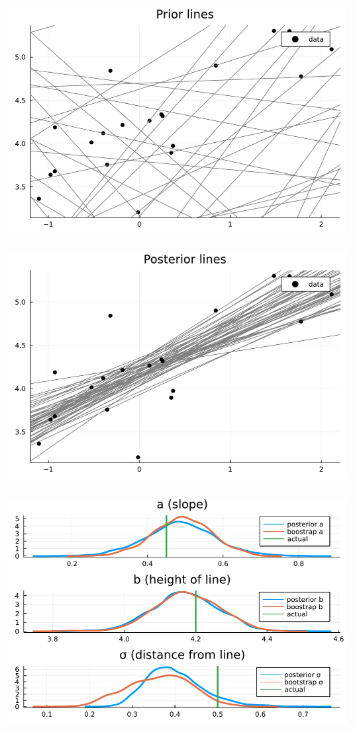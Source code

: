 \documentclass[aspectratio=169,xcolor=svgnames]{beamer}
\begin{document}
\begin{frame}
  \begin{figure}[ht]
    \centering
    \includegraphics[width=0.8\textwidth]{figures/linear_prior_lines.pdf}
  \end{figure}
\end{frame}

\begin{frame}
  \begin{figure}[ht]
    \centering
    \includegraphics[width=0.8\textwidth]{figures/posterior_lines.pdf}
  \end{figure}
\end{frame}

\begin{frame}
\begin{figure}[ht]
  \centering
  \includegraphics[width=0.8\textwidth]{figures/posterior_parameters.pdf}
\end{figure}
\end{frame}
\end{document}
